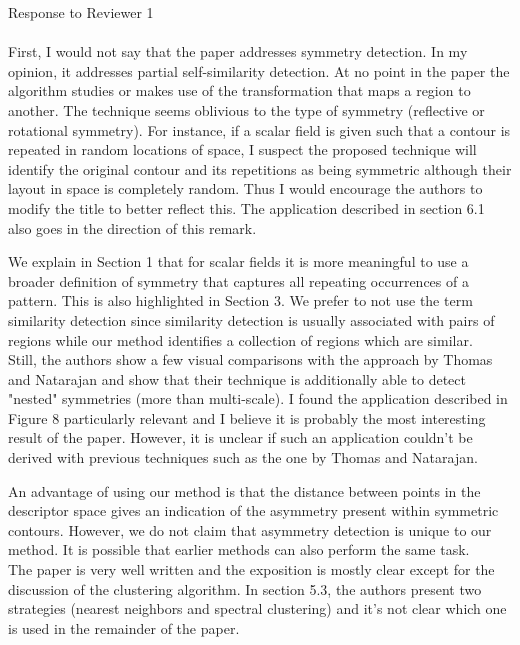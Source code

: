 \documentclass[10pt]{article}
\begin{document}
{\noindent \LARGE Response to Reviewer 1}\\\\
   First, I would not say that the paper addresses symmetry detection. In my
   opinion, it addresses partial self-similarity detection. At no point in
   the paper the algorithm studies or makes use of the transformation that
   maps a region to another. The technique seems oblivious to the type of
   symmetry (reflective or rotational symmetry). For instance, if a scalar
   field is given such that a contour is repeated in random locations of
   space, I suspect the proposed technique will identify the original
   contour and its repetitions as being symmetric although their layout in
   space is completely random. Thus I would encourage the authors to modify
   the title to better reflect this. The application described in section
   6.1 also goes in the direction of this remark.

	
   {\color{blue}We explain in Section 1 that for scalar fields it is more
	   meaningful to use a broader definition of symmetry that captures
	   all repeating occurrences of a pattern. This is also highlighted in
	   Section 3. We prefer to not use the term similarity detection
	   since similarity detection is usually associated with pairs of regions
   	   while our method identifies a collection of regions which are similar.}\\

   Still, the authors show a few visual comparisons with the approach by
   Thomas and Natarajan and show that their technique is additionally able
   to detect "nested" symmetries (more than multi-scale).
   I found the application described in Figure 8 particularly relevant and I
   believe it is probably the most interesting result of the paper. However,
   it is unclear if such an application couldn't be derived with previous
   techniques such as the one by Thomas and Natarajan.

   {\color{blue}An advantage of using our method is that the distance between
	   points in the descriptor space gives an indication of the asymmetry
	   present within symmetric contours. However, we do not claim that
	   asymmetry detection is unique to our method. It is possible that
   earlier methods can also perform the same task.}\\

The paper is very well written and the exposition is mostly clear except
   for the discussion of the clustering algorithm. In section 5.3, the
   authors present two strategies (nearest neighbors and spectral
   clustering) and it's not clear which one is used in the remainder of the
   paper.
\end{document}
